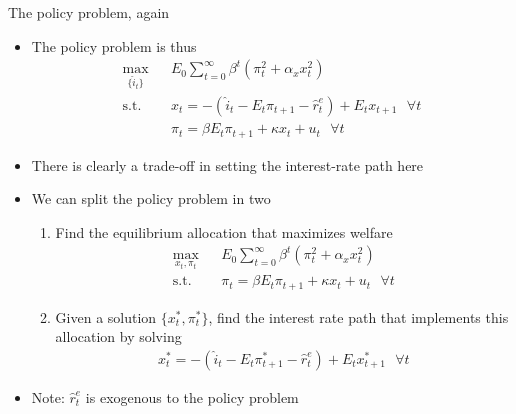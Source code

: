 \documentclass[9pt,xcolor={dvipsnames}]{beamer}
\newcommand{\bit}{\begin{itemize}}
\newcommand{\eit}{\end{itemize}}
\newcommand{\ben}{\begin{enumerate}}
\newcommand{\een}{\end{enumerate}}
\begin{document}
\begin{frame}{The policy problem, again}

\bit
\setlength\itemsep{1.5em}
\item The policy problem is thus
\begin{eqnarray}
\max_{\{\hat i_t\}} && E_0 \sum_{t=0}^{\infty} \beta^t (\pi_t^2 + \alpha_x x_t^2) \nonumber \\
\text{s.t. } &&  x_t = - (\hat i_t-E_t \pi_{t+1}-\hat r^e_t) + E_t x_{t+1} \text{  } \forall t \nonumber \\
&& \pi_t = \beta E_t \pi_{t+1} + \kappa x_t + u_t \text{  } \forall t \nonumber 
\end{eqnarray}

\item There is clearly a trade-off in setting the interest-rate path here

\item We can split the policy problem in two
\ben
	\item Find the equilibrium allocation that maximizes welfare	
	\begin{eqnarray}
	\max_{x_t, \pi_t} && E_0 \sum_{t=0}^{\infty} \beta^t (\pi_t^2 + \alpha_x x_t^2) \nonumber \\
	\text{s.t. } &&  \pi_t = \beta E_t \pi_{t+1} + \kappa x_t + u_t \text{  } \forall t \nonumber 
	\end{eqnarray}

\item Given a solution $\{x^*_t, \pi^*_t \}$, find the interest rate path that implements this allocation by solving
\begin{eqnarray}
x^*_t = - (\hat i_t-E_t \pi^*_{t+1}-\hat r^e_t) + E_t x^*_{t+1} \text{  } \forall t \nonumber 
\end{eqnarray}	
\een

\item Note: $\hat r^e_t$ is exogenous to the policy problem

\eit

\end{frame}
\end{document}
